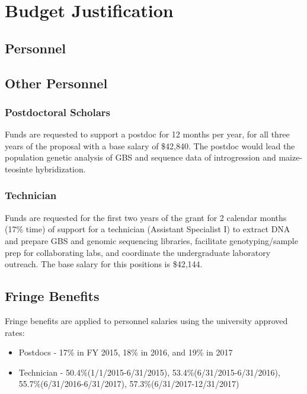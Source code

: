 \documentclass[11pt,letterpaper]{article}
\newcommand{\required}[1]{\section*{\hfil #1\hfil}}                    %
\begin{document}
\setcounter{page}{1}

\required{Budget Justification}

\subsection*{Personnel}


\subsection*{Other Personnel}
\subsubsection{Postdoctoral Scholars}
Funds are requested to support a postdoc for 12 months per year, for all three years of the proposal with a base salary of \$42,840. The postdoc would lead the population genetic analysis of GBS and sequence data of introgression and maize-teosinte hybridization.

\subsubsection{Technician}
Funds are requested for the first two years of the grant for 2 calendar months (17\% time) of support for a technician (Assistant Specialist I) to extract DNA and prepare GBS and genomic sequencing libraries, facilitate genotyping/sample prep for collaborating labs, and coordinate the undergraduate laboratory outreach. The base salary for this positions is \$42,144.


\subsection*{Fringe Benefits}
Fringe benefits are applied to personnel salaries using the university approved rates:
\begin{itemize}
\item Postdocs - 17\% in FY 2015, 18\% in 2016, and 19\% in 2017
\item Technician - 50.4\%(1/1/2015-6/31/2015), 53.4\%(6/31/2015-6/31/2016), 55.7\%(6/31/2016-6/31/2017), 57.3\%(6/31/2017-12/31/2017)
\end{itemize}
\end{document}

